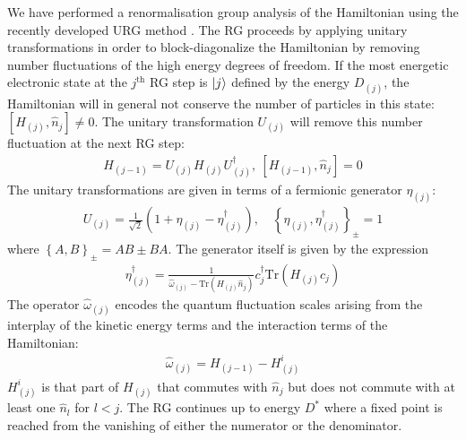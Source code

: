 \documentclass[reprint,prb,superscriptaddress]{revtex4-1}
\begin{document}
We have performed a renormalisation group analysis of the Hamiltonian using the recently developed URG method \cite{anirbanmott1,anirbanmott2,anirbanurg1,anirbanurg2,siddharthacpi,santanukagome,1dhubjhep}. The RG proceeds {by applying unitary transformations in order to block-diagonalize the Hamiltonian by removing number fluctuations of the high energy degrees of freedom}. If the most energetic electronic state at the \(j^\text{th}\) RG step is \(\ket{j}\) defined by the energy \(D_{(j)}\), the Hamiltonian will in general not conserve the number of particles in this state: \(\left[H_{(j)}, \hat n_{j}\right] \neq 0\). The unitary transformation \(U_{(j)}\) will remove this number fluctuation at the next RG step:
\begin{equation}\begin{aligned}
	H_{(j-1)} = U_{(j)} H_{(j)} U^\dagger_{(j)}, ~\left[H_{(j-1)}, \hat n_{j}\right] =0
\end{aligned}\end{equation}
The unitary transformations are given in terms of a fermionic generator \(\eta_{(j)}\):
\begin{equation}\begin{aligned}
	U_{(j)} = \frac{1}{\sqrt 2}\left(1 + \eta_{(j)} - \eta_{(j)}^\dagger\right), \quad\left\{ \eta_{(j)},\eta_{(j)}^\dagger \right\}_\pm = 1
\end{aligned}\end{equation}
where \(\left\{A,B\right\}_\pm = AB \pm BA\). The generator itself is given by the expression
\begin{equation}\begin{aligned}
	\eta^\dagger_{(j)} = \frac{1}{\hat \omega_{(j)} - \text{Tr}\left(H_{(j)} \hat n_{j}\right) } c^\dagger_{j} \text{Tr}\left(H_{(j)}c_{j}\right)
\end{aligned}\end{equation}
The operator \(\hat \omega_{(j)}\) encodes the quantum fluctuation scales arising from the interplay of the kinetic energy terms and the interaction terms of the Hamiltonian:
\begin{equation}\begin{aligned}
	\hat \omega_{(j)} = H_{(j-1)} - H^i_{(j)}
\end{aligned}\end{equation}
\(H^i_{(j)}\) is that part of \(H_{(j)}\) that commutes with \(\hat n_j\) but does not commute with at least one \(\hat n_l\) for \(l < j\). The RG continues up to energy \(D^*\) where a fixed point is reached from the vanishing of either the numerator or the denominator.
\end{document}
